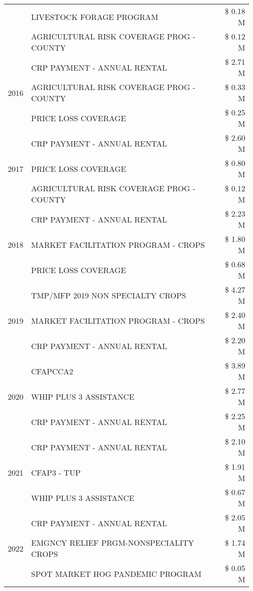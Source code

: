 \begin{tabular}{llr}
 & LIVESTOCK FORAGE PROGRAM & \$ 0.18 M \\
 & AGRICULTURAL RISK COVERAGE PROG - COUNTY & \$ 0.12 M \\
\cline{1-3}
\multirow[t]{3}{*}{2016} & CRP PAYMENT - ANNUAL RENTAL & \$ 2.71 M \\
 & AGRICULTURAL RISK COVERAGE PROG - COUNTY & \$ 0.33 M \\
 & PRICE LOSS COVERAGE & \$ 0.25 M \\
\cline{1-3}
\multirow[t]{3}{*}{2017} & CRP PAYMENT - ANNUAL RENTAL & \$ 2.60 M \\
 & PRICE LOSS COVERAGE & \$ 0.80 M \\
 & AGRICULTURAL RISK COVERAGE PROG - COUNTY & \$ 0.12 M \\
\cline{1-3}
\multirow[t]{3}{*}{2018} & CRP PAYMENT - ANNUAL RENTAL & \$ 2.23 M \\
 & MARKET FACILITATION PROGRAM - CROPS & \$ 1.80 M \\
 & PRICE LOSS COVERAGE & \$ 0.68 M \\
\cline{1-3}
\multirow[t]{3}{*}{2019} & TMP/MFP 2019 NON SPECIALTY CROPS & \$ 4.27 M \\
 & MARKET FACILITATION PROGRAM - CROPS & \$ 2.40 M \\
 & CRP PAYMENT - ANNUAL RENTAL & \$ 2.20 M \\
\cline{1-3}
\multirow[t]{3}{*}{2020} & CFAPCCA2 & \$ 3.89 M \\
 & WHIP PLUS 3 ASSISTANCE & \$ 2.77 M \\
 & CRP PAYMENT - ANNUAL RENTAL & \$ 2.25 M \\
\cline{1-3}
\multirow[t]{3}{*}{2021} & CRP PAYMENT - ANNUAL RENTAL & \$ 2.10 M \\
 & CFAP3 - TUP & \$ 1.91 M \\
 & WHIP PLUS 3 ASSISTANCE & \$ 0.67 M \\
\cline{1-3}
\multirow[t]{3}{*}{2022} & CRP PAYMENT - ANNUAL RENTAL & \$ 2.05 M \\
 & EMGNCY RELIEF PRGM-NONSPECIALITY CROPS & \$ 1.74 M \\
 & SPOT MARKET HOG PANDEMIC PROGRAM & \$ 0.05 M \\
\cline{1-3}
\bottomrule
\end{tabular}
